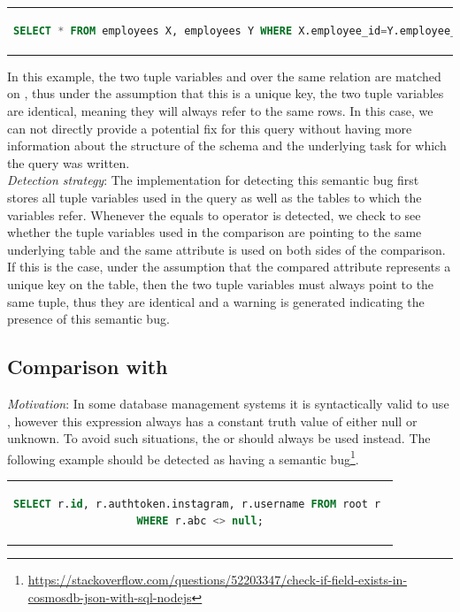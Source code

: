 \begin{center}
\begin{tabular}{c}
\begin{lstlisting}[language=SQL]
SELECT * FROM employees X, employees Y WHERE X.employee_id=Y.employee_id;
\end{lstlisting}
\end{tabular}
\end{center}

In this example, the two tuple variables  and  over the same relation  are matched on , thus under the assumption that this is a unique key, the two tuple variables are identical, meaning they will always refer to the same rows. In this case, we can not directly provide a potential fix for this query without having more information about the structure of the  schema and the underlying task for which the query was written.\\

\noindent \emph{Detection strategy}: The implementation for detecting this semantic bug first stores all tuple variables used in the query as well as the tables to which the variables refer. Whenever the equals to operator is detected, we check to see whether the tuple variables used in the comparison are pointing to the same underlying table and the same attribute is used on both sides of the comparison. If this is the case, under the assumption that the compared attribute represents a unique key on the table, then the two tuple variables must always point to the same tuple, thus they are identical and a warning is generated indicating the presence of this semantic bug.

\subsection{Comparison with }
\emph{Motivation}: In some database management systems it is syntactically valid to use , however this expression always has a constant truth value of either null or unknown. To avoid such situations, the  or  should always be used instead. The following example should be detected as having a semantic bug\footnote{\url{https://stackoverflow.com/questions/52203347/check-if-field-exists-in-cosmosdb-json-with-sql-nodejs}}.

\begin{center}
\begin{tabular}{c}
\begin{lstlisting}[language=SQL]
SELECT r.id, r.authtoken.instagram, r.username FROM root r 
WHERE r.abc <> null;
\end{lstlisting}
\end{tabular}
\end{center}

